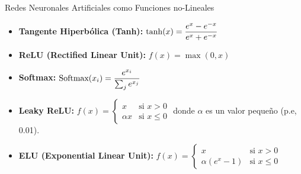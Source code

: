 \documentclass[10pt, envcountsect, handout, aspectratio=1610, hyperref={hypertexnames=true}]{beamer}
\begin{document}
\begin{frame}{Redes Neuronales Artificiales como Funciones no-Lineales}
\begin{itemize}
\begin{minipage}{.5\textwidth}
\begin{itemize}
					\item \textbf{Tangente Hiperbólica (Tanh):}  
					$\displaystyle
					\tanh(x) = \frac{e^x - e^{-x}}{e^x + e^{-x}}
					$
					
					\item \textbf{ReLU (Rectified Linear Unit):}  
					$
					f(x) = \max(0, x)
					$
					
					\item \textbf{Softmax:}  
					$\displaystyle
					\text{Softmax}(x_i) = \frac{e^{x_i}}{\sum_{j} e^{x_j}}
					$
				\end{itemize}
			\end{minipage}
			\begin{minipage}{.4\textwidth}
				\begin{itemize}

					\item \textbf{Leaky ReLU:}  
					$
					f(x) = 
					\begin{cases} 
						x & \text{si } x > 0 \\
						\alpha x & \text{si } x \leq 0
					\end{cases}
					$
					donde \( \alpha \) es un valor pequeño (p.e, 0.01).
					
					\item \textbf{ELU (Exponential Linear Unit):}  
					$
					f(x) = 
					\begin{cases} 
						x & \text{si } x > 0 \\
						\alpha (e^x - 1) & \text{si } x \leq 0
					\end{cases}
					$
				\end{itemize}
			\end{minipage}

	\end{itemize}

\end{frame}
\end{document}

